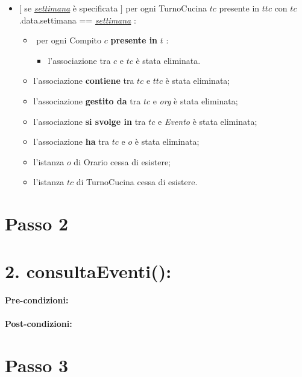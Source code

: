 {\begin{itemize}
   \item $[$ se \underline{\textit{settimana}} è specificata $]$ \textlangle per ogni TurnoCucina $tc$ presente in $ttc$ con $tc$.data.settimana == \underline{\textit{settimana}} \textrangle:
\begin{itemize}
   \item \textlangle $ $ per ogni Compito $c$ \textbf{presente in} $t$ \textrangle:
    \begin{itemize}
        \item l'associazione tra $c$ e $tc$ è stata eliminata.
        \end{itemize}
    \item l'associazione \textbf{contiene} tra $tc$ e $ttc$ è stata eliminata;
    \item l'associazione \textbf{gestito da} tra $tc$ e \textit{org} è stata eliminata;
\item l'associazione \textbf{si svolge in} tra $tc$ e \textit{Evento} è stata eliminata;
    \item l'associazione \textbf{ha} tra $tc$ e $o$ è stata eliminata;
    \item l'istanza $o$ di Orario cessa di esistere;
    \item l'istanza $tc$ di TurnoCucina cessa di esistere.
\end{itemize}

\end{itemize}

\section{Passo 2}
\section*{2. consultaEventi():}

\paragraph{Pre-condizioni:}

\paragraph{Post-condizioni:}


\section{Passo 3}
}
